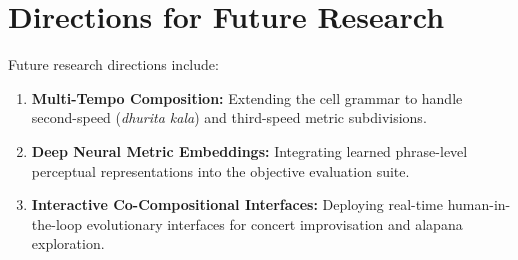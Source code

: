 \documentclass[12pt,a4paper]{report}
\begin{document}
\section{Directions for Future Research}
Future research directions include:
\begin{enumerate}
    \item \textbf{Multi-Tempo Composition:} Extending the cell grammar to handle second-speed (\textit{dhurita kala}) and third-speed metric subdivisions.
    \item \textbf{Deep Neural Metric Embeddings:} Integrating learned phrase-level perceptual representations into the objective evaluation suite.
    \item \textbf{Interactive Co-Compositional Interfaces:} Deploying real-time human-in-the-loop evolutionary interfaces for concert improvisation and alapana exploration.
\end{enumerate}
\end{document}
